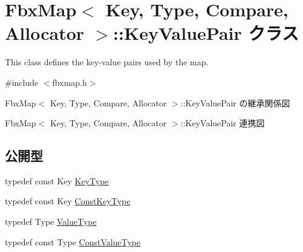 \hypertarget{class_fbx_map_1_1_key_value_pair}{}\section{Fbx\+Map$<$ Key, Type, Compare, Allocator $>$\+:\+:Key\+Value\+Pair クラス}
\label{class_fbx_map_1_1_key_value_pair}


This class defines the key-\/value pairs used by the map.  




{\ttfamily \#include $<$fbxmap.\+h$>$}



Fbx\+Map$<$ Key, Type, Compare, Allocator $>$\+:\+:Key\+Value\+Pair の継承関係図


Fbx\+Map$<$ Key, Type, Compare, Allocator $>$\+:\+:Key\+Value\+Pair 連携図
\subsection*{公開型}
\begin{DoxyCompactItemize}
\item 
typedef const Key \hyperlink{class_fbx_map_1_1_key_value_pair_a5e685c6ff77cdf31f878e5105737c1a3}{Key\+Type}
\item 
typedef const Key \hyperlink{class_fbx_map_1_1_key_value_pair_a74738485dc0b74e76e09dfbcdca9e62e}{Const\+Key\+Type}
\item 
typedef Type \hyperlink{class_fbx_map_1_1_key_value_pair_a716c83c1f6dabf173132b5acde84a9fe}{Value\+Type}
\item 
typedef const Type \hyperlink{class_fbx_map_1_1_key_value_pair_a13d0030dcec9979f30273cc4ac6ed871}{Const\+Value\+Type}
\end{DoxyCompactItemize}
